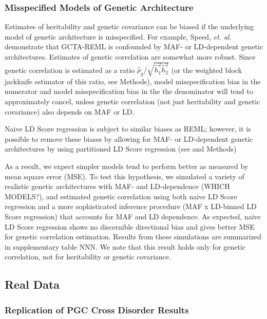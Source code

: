 \documentclass[11pt]{article}
\numberwithin{equation}{section}
\begin{document}
\subsubsection{Misspecified Models of Genetic Architecture}


Estimates of heritability and genetic covariance can be biased if the underlying model of genetic architecture is misspecified.
For example, Speed, \emph{et. al.} \cite{speed2012improved} 
demonstrate that GCTA-REML is confounded by MAF- or LD-dependent genetic architectures.
Estimates of genetic correlation are somewhat more robust.
Since genetic correlation is estimated as a ratio $\hat{\rho}_g / \sqrt{\hat{h}^2_1\hat{h}^2_2}$
(or the weighted block jackknife estimator of this ratio, see Methods),
model misspecification bias in the numerator and model misspecification bias in the the denominator 
will tend to approximately cancel, unless genetic correlation 
(not just heritability and genetic covariance) also depends on MAF or LD.

Naive LD Score regression is subject to similar biases as REML; however,
it is possible to remove these biases by allowing for MAF- or LD-dependent genetic architectures by using partitioned LD 
Score regression (see \cite{finucane2014partitioning} and Methods)

As a result, we expect simpler models tend to perform better as measured by mean square error (MSE).
To test this hypothesis, we simulated a variety of realistic genetic architectures with MAF- and LD-dependence (WHICH MODELS?), and estimated genetic correlation using both naive LD Score regression and a more sophisticated inference procedure (MAF x LD-binned LD Score regression) that accounts for MAF and LD dependence. 
As expected, naive LD Score regression shows no discernible directional bias and gives better MSE for genetic correlation estimation.
Results from these simulations are summarized in supplementary table NNN.
We note that this result holds only for genetic correlation, not for heritability or genetic covariance.


\subsection{Real Data}\label{Real Data}

\subsubsection{Replication of PGC Cross Disorder Results}
\end{document}
